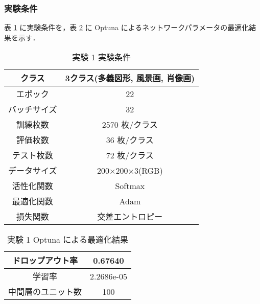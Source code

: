 \documentclass[twocolumn]{jarticle}     %
\newcommand{\1}{\mbox{1}\hspace{-0.25em}\mbox{l}}
\begin{document}
\subsubsection{実験条件}
表 \ref{tab:facelandmark} に実験条件を，表 \ref{tab:facelandmarkOptuna} に Optuna によるネットワークパラメータの最適化結果を示す．
\begin{table}[t]
	\begin{center}
		\caption{実験 1 実験条件}
		\label{tab:facelandmark}
		\begin{tabular}{|c|c|} \hline
			クラス&3クラス(多義図形, 風景画, 肖像画)\\ \hline
			エポック&22\\ \hline
			バッチサイズ&32\\ \hline
			訓練枚数&2570 枚/クラス\\ \hline
			評価枚数&36 枚/クラス\\ \hline
			テスト枚数&72 枚/クラス\\ \hline
			データサイズ&200×200×3(RGB)\\ \hline
			活性化関数&Softmax\\ \hline
			最適化関数&Adam\\ \hline
			損失関数&交差エントロピー\\ \hline
		\end{tabular}
	\end{center}
\end{table}
\begin{table}[t]
	\begin{center}
		\caption{実験 1  Optuna による最適化結果}
		\label{tab:facelandmarkOptuna}
		\begin{tabular}{|c|c|} \hline
			ドロップアウト率& 0.67640\\ \hline
			学習率&2.2686e-05\\ \hline
			中間層のユニット数&100\\ \hline
		\end{tabular}
	\end{center}
\end{table}
\end{document}
